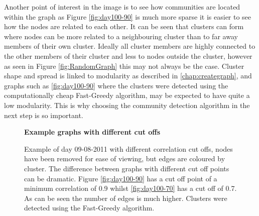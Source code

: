 Another point of interest in the image is to see how communities are located within the graph as Figure \ref{fig:day100-90} is much more sparse it is easier to see how the nodes are related to each other. It can be seen that clusters can form where nodes can be more related to a neighbouring cluster than to far away members of their own cluster. Ideally all cluster members are highly connected to the other members of their cluster and less to nodes outside the cluster, however as seen in Figure \ref{fig:RandomGraph} this may not always be the case. Cluster shape and spread is linked to modularity as described in \ref{chap:creategraph}, and graphs such as \ref{fig:day100-90} where the clusters were detected using the computationally cheap Fast-Greedy algorithm, may be expected to have quite a low modularity. This is why choosing the community detection algorithm in the next step is so important.

\begin{figure}[ht]
\centering
\textbf{Example graphs with different cut offs}\par\medskip
{}

\caption[Example graphs with different cut offs]{Example of day 09-08-2011 with different correlation cut offs, nodes have been removed for ease of viewing, but edges are coloured by cluster. The difference between graphs with different cut off points can be dramatic. Figure \ref{fig:day100-90} has a cut off point of a minimum correlation of 0.9 whilst \ref{fig:day100-70} has a cut off of 0.7. As can be seen the number of edges is much higher. Clusters were detected using the Fast-Greedy algorithm.}
\label{fig:cutoff70vs90}
\end{figure}


